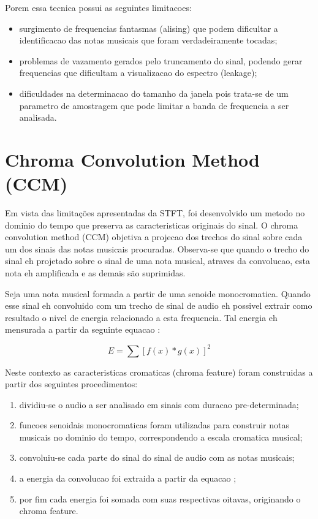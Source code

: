 \documentclass{article}
\begin{document}
	Porem essa tecnica possui as seguintes limitacoes:
	\begin{itemize}
		\item surgimento de frequencias fantasmas (alising) que podem dificultar a identificacao das notas musicais que foram verdadeiramente tocadas;
		\item problemas de vazamento gerados pelo truncamento do sinal, podendo gerar frequencias que dificultam a visualizacao do espectro (leakage);
		\item dificuldades na determinacao do tamanho da janela pois trata-se de um parametro de amostragem que pode limitar a banda de frequencia a ser analisada.
	\end{itemize}


\section{Chroma Convolution Method (CCM)}\label{sec:ccm}

	Em vista das limitações apresentadas da STFT, foi desenvolvido um metodo no dominio do tempo que preserva as caracteristicas originais do sinal. O chroma convolution method (CCM) objetiva a projecao dos trechos do sinal sobre cada um dos sinais das notas musicais procuradas. Observa-se que quando o trecho do sinal eh projetado sobre o sinal de uma nota musical, atraves da convolucao, esta nota eh amplificada e as demais são suprimidas.

	Seja uma nota musical formada a partir de uma senoide monocromatica. Quando esse sinal eh convoluido com um trecho de sinal de audio eh possivel extrair como resultado o nivel de energia relacionado a esta frequencia. Tal energia eh mensurada a partir da seguinte equacao :

	\begin{equation}\label{ccm_equation}
		E = \sum [f(x)*g(x)]^{2}
	\end{equation}

	Neste contexto as caracteristicas cromaticas (chroma feature) foram construidas a partir dos seguintes procedimentos:
	\begin{enumerate}
		\item dividiu-se o audio a ser analisado em sinais com duracao pre-determinada;
		\item funcoes senoidais monocromaticas foram utilizadas para construir notas musicais no dominio do tempo, correspondendo a escala cromatica musical; 
		\item convoluiu-se cada parte do sinal do sinal de audio com as notas musicais;
		\item a energia da convolucao foi extraida a partir da equacao ;
		\item por fim cada energia foi somada com suas respectivas oitavas, originando o chroma feature.
	\end{enumerate}
\end{document}
